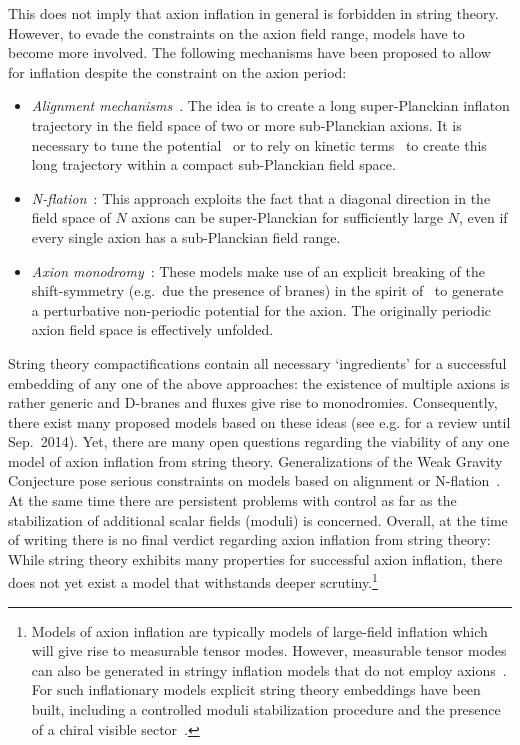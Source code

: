 This does not imply that axion inflation in general is forbidden in string theory. However, to evade the constraints on the axion field range, models have to become more involved. The following mechanisms have been proposed to allow for inflation despite the constraint on the axion period:
\begin{itemize}
\item \textit{Alignment mechanisms}~\cite{Kim:2004rp}. The idea is to create a long super-Planckian inflaton trajectory in the field space of two or more sub-Planckian axions. It is necessary to tune the potential~\cite{Kim:2004rp} or to rely on kinetic terms~\cite{1404.7496, Shiu:2015xda} to create this long trajectory within a compact sub-Planckian field space. 
\item \textit{N-flation}~\cite{Dimopoulos:2005ac, Cicoli:2014sva, Das:2014gua}: This approach exploits the fact that a diagonal direction in the field space of $N$ axions can be super-Planckian for sufficiently large $N$, even if every single axion has a sub-Planckian field range.
\item \textit{Axion monodromy}~\cite{Silverstein:2008sg, 0808.0706}: These models make use of an explicit breaking of the shift-symmetry (e.g.~due the presence of branes) in the spirit of~\cite{0507215, 0811.1989, 1101.0026} to generate a perturbative non-periodic potential for the axion. The originally periodic axion field space is effectively unfolded. 
\end{itemize}
String theory compactifications contain all necessary `ingredients' for a successful embedding of any one of the above approaches: the existence of multiple axions is rather generic and D-branes and fluxes give rise to monodromies. Consequently, there exist many proposed models based on these ideas (see e.g.\cite{1409.5350} for a review until Sep.~2014). Yet, there are many open questions regarding the viability of any one model of axion inflation from string theory. Generalizations of the Weak Gravity Conjecture pose serious constraints on models based on alignment or N-flation~\cite{1503.00795, 1506.03447}. At the same time there are persistent problems with control as far as the stabilization of additional scalar fields (moduli) is concerned. Overall, at the time of writing there is no final verdict regarding axion inflation from string theory: While string theory exhibits many properties for successful axion inflation, there does not yet exist a model that withstands deeper scrutiny.\footnote{Models of axion inflation are typically models of large-field inflation which will give rise to measurable tensor modes. However, measurable tensor modes can also be generated in stringy inflation models that do not employ axions~\cite{Cicoli:2008gp, Burgess:2016owb, Cicoli:2016chb}. For such inflationary models explicit string theory embeddings have been built, including a controlled moduli stabilization procedure and the presence of a chiral visible sector~\cite{Cicoli:2016xae, ChiralGlobalFibre}.}

